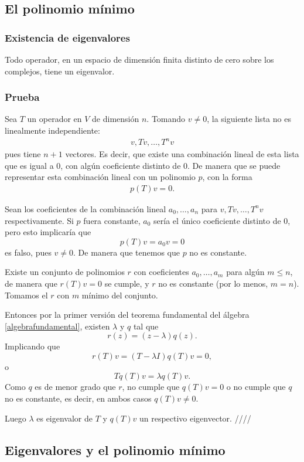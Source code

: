 \documentclass{article}
\begin{document}
\subsection{El polinomio mínimo}
\subsubsection{Existencia de eigenvalores}
Todo operador, en un espacio de dimensión finita distinto de cero
sobre los complejos, tiene un eigenvalor.
\subsubsection*{Prueba}
Sea $T$ un operador en $V$ de dimensión $n$. Tomando $v\neq 0$, la siguiente lista no es linealmente 
independiente:
\begin{align}\label{lista}
    v, Tv, \ldots, T^n v
\end{align}
pues tiene $n+1$ vectores. Es decir, que existe
una combinación lineal de esta lista que es igual a $0$,
con algún coeficiente distinto de $0$. De manera que se
puede representar esta combinación lineal con un polinomio
$p$, con la forma
\begin{align}
    p(T)v = 0.
\end{align}

Sean los coeficientes de la combinación lineal
$a_0,\ldots,a_n$ para $v,Tv,\ldots,T^n v$ respectivamente.
Si $p$ fuera constante, $a_0$ sería
el único coeficiente distinto de $0$, pero
esto implicaría que
$$p(T)v=a_0v =0$$
es falso, pues $v\neq 0$. De manera que tenemos que $p$
no es constante.

Existe un conjunto de polinomios $r$ con
coeficientes $a_0,\ldots,a_m$ para algún $m\leq n$, de 
manera que $r(T)v=0$ se cumple, y $r$ no es constante
(por lo menos, $m=n$).
Tomamos el $r$ con $m$ mínimo del conjunto.

Entonces por la primer versión del teorema fundamental del
álgebra \ref{algebrafundamental}, existen
$\lambda$ y $q$ tal que
$$r(z) = (z-\lambda)q(z).$$
Implicando que
$$r(T)v = (T-\lambda I)q(T)v = 0,$$
o
$$Tq(T)v = \lambda q(T)v.$$
Como $q$ es de menor grado que $r$, no cumple que $q(T)v = 0$ o
no cumple que $q$ no es constante, es decir, en ambos casos
$q(T)v\neq 0$.

Luego $\lambda$ es
eigenvalor de $T$ y $q(T)v$ un respectivo eigenvector.
\hfill ////

\subsection{Eigenvalores y el polinomio mínimo}
\end{document}

